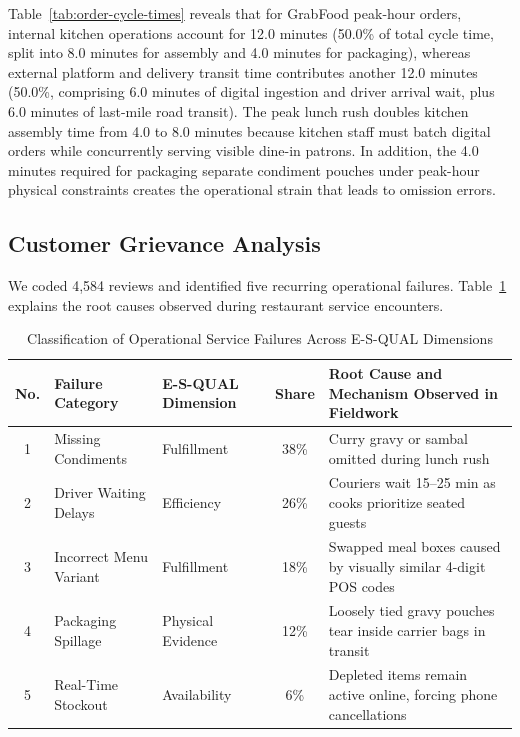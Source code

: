 \documentclass{jomas}
\begin{document}
Table~\ref{tab:order-cycle-times} reveals that for GrabFood peak-hour orders, internal kitchen operations account for 12.0 minutes (50.0\% of total cycle time, split into 8.0 minutes for assembly and 4.0 minutes for packaging), whereas external platform and delivery transit time contributes another 12.0 minutes (50.0\%, comprising 6.0 minutes of digital ingestion and driver arrival wait, plus 6.0 minutes of last-mile road transit). The peak lunch rush doubles kitchen assembly time from 4.0 to 8.0 minutes because kitchen staff must batch digital orders while concurrently serving visible dine-in patrons. In addition, the 4.0 minutes required for packaging separate condiment pouches under peak-hour physical constraints creates the operational strain that leads to omission errors.

\subsection{Customer Grievance Analysis}
We coded 4,584 reviews and identified five recurring operational failures. Table~\ref{tab:complaint-categories} explains the root causes observed during restaurant service encounters.

\begin{table}[H]
\caption{Classification of Operational Service Failures Across E-S-QUAL Dimensions}
\label{tab:complaint-categories}
\centering
\small
\setlength{\tabcolsep}{5pt}
\begin{tabularx}{\textwidth}{c l l c X}
\toprule
\textbf{No.} & \textbf{Failure Category} & \textbf{E-S-QUAL Dimension} & \textbf{Share} & \textbf{Root Cause and Mechanism Observed in Fieldwork} \\
\midrule
1 & Missing Condiments & Fulfillment & 38\% & Curry gravy or sambal omitted during lunch rush \\
2 & Driver Waiting Delays & Efficiency & 26\% & Couriers wait 15--25 min as cooks prioritize seated guests \\
3 & Incorrect Menu Variant & Fulfillment & 18\% & Swapped meal boxes caused by visually similar 4-digit POS codes \\
4 & Packaging Spillage & Physical Evidence & 12\% & Loosely tied gravy pouches tear inside carrier bags in transit \\
5 & Real-Time Stockout & Availability & 6\% & Depleted items remain active online, forcing phone cancellations \\
\bottomrule
\end{tabularx}
\end{table}
\end{document}
